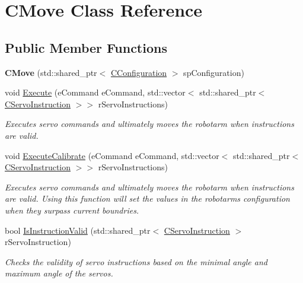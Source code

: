 \hypertarget{classCMove}{}\section{C\+Move Class Reference}
\label{classCMove}
\subsection*{Public Member Functions}
\begin{DoxyCompactItemize}
\item 
\mbox{\label{classCMove_a49dbf1de9a8eadbf9ea8b1929ca3e626}} 
{\bfseries C\+Move} (std\+::shared\+\_\+ptr$<$ \hyperlink{classCConfiguration}{C\+Configuration} $>$ sp\+Configuration)
\item 
void \hyperlink{classCMove_a0c7bf10c045b4369b0d32a63d93ed990}{Execute} (e\+Command e\+Command, std\+::vector$<$ std\+::shared\+\_\+ptr$<$ \hyperlink{classCServoInstruction}{C\+Servo\+Instruction} $>$$>$ r\+Servo\+Instructions)
\begin{DoxyCompactList}\small\item\em Executes servo commands and ultimately moves the robotarm when instructions are valid. \end{DoxyCompactList}\item 
void \hyperlink{classCMove_a9fdfeec108cc173657146525cdf48824}{Execute\+Calibrate} (e\+Command e\+Command, std\+::vector$<$ std\+::shared\+\_\+ptr$<$ \hyperlink{classCServoInstruction}{C\+Servo\+Instruction} $>$$>$ r\+Servo\+Instructions)
\begin{DoxyCompactList}\small\item\em Executes servo commands and ultimately moves the robotarm when instructions are valid. Using this function will set the values in the robotarms configuration when they surpass current boundries. \end{DoxyCompactList}\item 
bool \hyperlink{classCMove_a42a503487eb0aeed688fad00e18c8071}{Is\+Instruction\+Valid} (std\+::shared\+\_\+ptr$<$ \hyperlink{classCServoInstruction}{C\+Servo\+Instruction} $>$ r\+Servo\+Instruction)
\begin{DoxyCompactList}\small\item\em Checks the validity of servo instructions based on the minimal angle and maximum angle of the servo\textquotesingle{}s. \end{DoxyCompactList}\item 

\end{DoxyCompactItemize}
